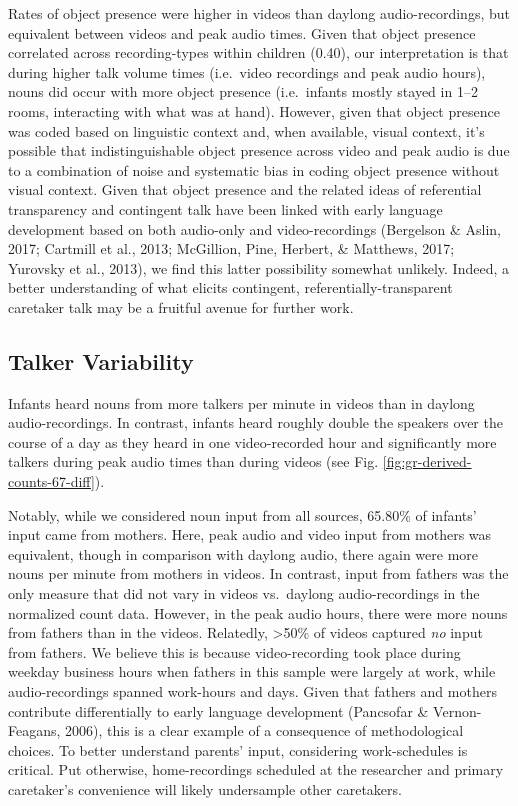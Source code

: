 \documentclass[man]{apa6}
\theoremstyle{definition}
\theoremstyle{definition}
\theoremstyle{definition}
\theoremstyle{remark}
\begin{document}
Rates of object presence were higher in videos than daylong
audio-recordings, but equivalent between videos and peak audio times.
Given that object presence correlated across recording-types within
children (0.40), our interpretation is that during higher talk volume
times (i.e.~video recordings and peak audio hours), nouns did occur with
more object presence (i.e.~infants mostly stayed in 1--2 rooms,
interacting with what was at hand). However, given that object presence
was coded based on linguistic context and, when available, visual
context, it's possible that indistinguishable object presence across
video and peak audio is due to a combination of noise and systematic
bias in coding object presence without visual context. Given that object
presence and the related ideas of referential transparency and
contingent talk have been linked with early language development based
on both audio-only and video-recordings (Bergelson \& Aslin, 2017;
Cartmill et al., 2013; McGillion, Pine, Herbert, \& Matthews, 2017;
Yurovsky et al., 2013), we find this latter possibility somewhat
unlikely. Indeed, a better understanding of what elicits contingent,
referentially-transparent caretaker talk may be a fruitful avenue for
further work.

\subsection{Talker Variability}\label{talker-variability}

Infants heard nouns from more talkers per minute in videos than in
daylong audio-recordings. In contrast, infants heard roughly double the
speakers over the course of a day as they heard in one video-recorded
hour and significantly more talkers during peak audio times than during
videos (see Fig. \ref{fig:gr-derived-counts-67-diff}).

Notably, while we considered noun input from all sources, 65.80\% of
infants' input came from mothers. Here, peak audio and video input from
mothers was equivalent, though in comparison with daylong audio, there
again were more nouns per minute from mothers in videos. In contrast,
input from fathers was the only measure that did not vary in videos
vs.~daylong audio-recordings in the normalized count data. However, in
the peak audio hours, there were more nouns from fathers than in the
videos. Relatedly, \textgreater{}50\% of videos captured \emph{no} input
from fathers. We believe this is because video-recording took place
during weekday business hours when fathers in this sample were largely
at work, while audio-recordings spanned work-hours and days. Given that
fathers and mothers contribute differentially to early language
development (Pancsofar \& Vernon-Feagans, 2006), this is a clear example
of a consequence of methodological choices. To better understand
parents' input, considering work-schedules is critical. Put otherwise,
home-recordings scheduled at the researcher and primary caretaker's
convenience will likely undersample other caretakers.
\end{document}
